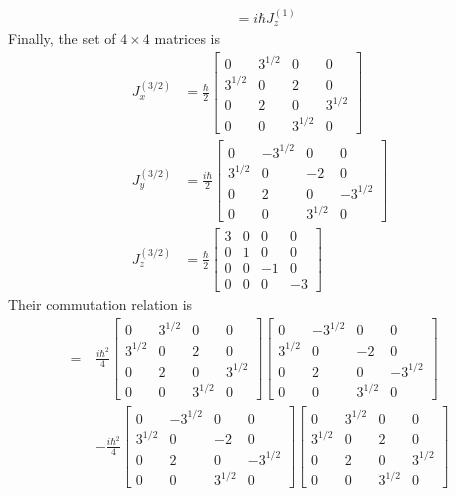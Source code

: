 \documentclass[../principles-of-quantum-mechanics.tex]{subfiles}
\begin{document}
\begin{questions}
\begin{solution}
\begin{align*}
				&= i\hbar J_z^{(1)}
			\end{align*}
			Finally, the set of $4\times4$ matrices is
			\begin{align*}
				J_x^{(3/2)} &= \frac{\hbar}{2}\begin{bmatrix}0 & 3^{1/2} & 0 & 0 \\ 3^{1/2} & 0 & 2 & 0 \\ 0 & 2 & 0 & 3^{1/2} \\ 0 & 0 & 3^{1/2} & 0\end{bmatrix}\\
				J_y^{(3/2)} &= \frac{i\hbar}{2}\begin{bmatrix}0 & -3^{1/2} & 0 & 0 \\ 3^{1/2} & 0 & -2 & 0 \\ 0 & 2 & 0 & -3^{1/2} \\ 0 & 0 & 3^{1/2} & 0  \end{bmatrix} \\
				J_z^{(3/2)} &= \frac{\hbar}{2}\begin{bmatrix}3 & 0 & 0 & 0 \\ 0 & 1 & 0 & 0 \\ 0 & 0 & -1 & 0 \\ 0 & 0 & 0 & -3\end{bmatrix}
			\end{align*}
			Their commutation relation is
			\begin{align*}
				[J_x^{(3/2)}, J_y^{(3/2)}] =\,&\frac{i\hbar^2}{4}\begin{bmatrix}0 & 3^{1/2} & 0 & 0 \\ 3^{1/2} & 0 & 2 & 0 \\ 0 & 2 & 0 & 3^{1/2} \\ 0 & 0 & 3^{1/2} & 0\end{bmatrix}\begin{bmatrix}0 & -3^{1/2} & 0 & 0 \\ 3^{1/2} & 0 & -2 & 0 \\ 0 & 2 & 0 & -3^{1/2} \\ 0 & 0 & 3^{1/2} & 0  \end{bmatrix} \\
				&- \frac{i\hbar^2}{4}\begin{bmatrix}0 & -3^{1/2} & 0 & 0 \\ 3^{1/2} & 0 & -2 & 0 \\ 0 & 2 & 0 & -3^{1/2} \\ 0 & 0 & 3^{1/2} & 0  \end{bmatrix}\begin{bmatrix}0 & 3^{1/2} & 0 & 0 \\ 3^{1/2} & 0 & 2 & 0 \\ 0 & 2 & 0 & 3^{1/2} \\ 0 & 0 & 3^{1/2} & 0\end{bmatrix} \\

\end{align*}
\end{solution}
\end{questions}
\end{document}
